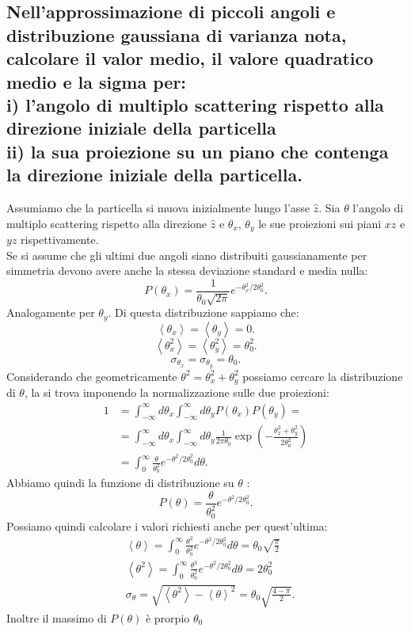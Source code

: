 \subsection[]{Nell'approssimazione di piccoli angoli e distribuzione gaussiana di varianza nota, calcolare il valor medio, il valore quadratico medio e la sigma per:\\
i) l'angolo di multiplo scattering rispetto alla direzione iniziale della particella\\
ii) la sua proiezione su un piano che contenga la direzione iniziale della particella.
}
\label{sec:4.b.17}
Assumiamo che la particella si muova inizialmente lungo l'asse $\hat{z}$. Sia $\theta$ l'angolo di multiplo scattering rispetto alla direzione $\hat{z}$ e $\theta_{x}$, $\theta_{y}$ le sue proiezioni sui piani $xz$ e $yz$ rispettivamente.\\
Se si assume che gli ultimi due angoli siano distribuiti gaussianamente per simmetria devono avere anche la stessa deviazione standard e media nulla:
\[
	P\left( \theta_{x} \right) = \frac{1}{\theta_0 \sqrt{2\pi} } e^{- \theta^2_{x} / 2\theta_0^2}
.\] 
Analogamente per $\theta_{y}$. Di questa distribuzione sappiamo che:
\[
	\left<\theta_{x} \right> = \left<\theta_{y} \right> = 0
.\] 
\[
	\left<\theta_{x}^2 \right> = \left< \theta_{y}^2 \right> = \theta_0^2
.\] 
\[
	\sigma_{\theta_{x}} = \sigma_{\theta_{y}} = \theta_0
.\] 
Considerando che geometricamente $\theta^2 = \theta_{x}^2+\theta_{y}^2$ possiamo cercare la distribuzione di $\theta$, la si trova imponendo la normalizzazione sulle due proiezioni:
\begin{align*}
	1 &= \int_{-\infty}^{\infty}d\theta_{x} \int_{-\infty}^{\infty}d\theta_{y} P\left( \theta_{x} \right) P\left( \theta_{y} \right) =\\
	  &=  \int_{-\infty}^{\infty}d\theta_{x} \int_{-\infty}^{\infty}d\theta_{y}  \frac{1}{2\pi \theta_0} \exp\left( - \frac{\theta_{x}^2+\theta_{y}^2}{2\theta_0^2} \right) \\
	  &= \int_{0}^{\infty} \frac{\theta}{\theta_0^2} e^{- \theta^2 /2\theta_0^2} d\theta
.\end{align*}
Abbiamo quindi la funzione di distribuzione su $\theta$ :
\[
	P\left( \theta \right) = \frac{\theta}{\theta_0^2} e^{- \theta^2 /2\theta_0^2}
.\] 
Possiamo quindi calcolare i valori richiesti anche per quest'ultima:
\begin{align*}
	& \left<\theta \right> = \int_{0}^{\infty} \frac{\theta^2}{\theta_0^2} e^{- \theta^2 /2\theta_0^2} d\theta = \theta_0 \sqrt{\frac{\pi}{2}}\\
	& \left<\theta^2 \right> = \int_{0}^{\infty}\frac{\theta^3}{\theta_0^2} e^{- \theta^2 /2\theta_0^2} d\theta = 2 \theta_0^2 \\
	& \sigma_\theta = \sqrt{\left<\theta^2 \right>- \left< \theta \right>^2} =\theta_0 \sqrt{ \frac{4-\pi}{2}} 
.\end{align*}
Inoltre il massimo di $P\left( \theta \right)$ è prorpio $\theta_0$


